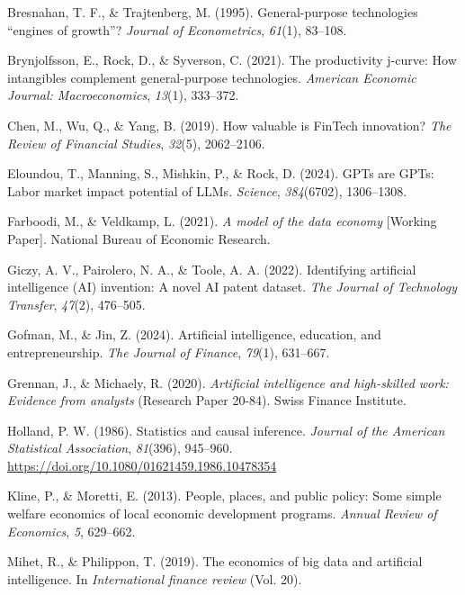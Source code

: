 \documentclass[
]{article}
\newlength{\cslhangindent}
\newenvironment{CSLReferences}[2] %
 {\begin{list}{}{%
  \setlength{\itemindent}{0pt}
  \setlength{\leftmargin}{0pt}
  \setlength{\parsep}{0pt}
  \ifodd #1
   \setlength{\leftmargin}{\cslhangindent}
   \setlength{\itemindent}{-1\cslhangindent}
  \fi
  \setlength{\itemsep}{#2\baselineskip}}}
 {\end{list}}
\begin{document}
\begin{CSLReferences}{1}{0}
Bresnahan, T. F., \& Trajtenberg, M. (1995). General-purpose
technologies {``engines of growth''}? \emph{Journal of Econometrics},
\emph{61}(1), 83--108.

Brynjolfsson, E., Rock, D., \& Syverson, C. (2021). The productivity
j-curve: How intangibles complement general-purpose technologies.
\emph{American Economic Journal: Macroeconomics}, \emph{13}(1),
333--372.

Chen, M., Wu, Q., \& Yang, B. (2019). How valuable is FinTech
innovation? \emph{The Review of Financial Studies}, \emph{32}(5),
2062--2106.

Eloundou, T., Manning, S., Mishkin, P., \& Rock, D. (2024). GPTs are
GPTs: Labor market impact potential of LLMs. \emph{Science},
\emph{384}(6702), 1306--1308.

Farboodi, M., \& Veldkamp, L. (2021). \emph{A model of the data economy}
{[}Working Paper{]}. National Bureau of Economic Research.

Giczy, A. V., Pairolero, N. A., \& Toole, A. A. (2022). Identifying
artificial intelligence (AI) invention: A novel AI patent dataset.
\emph{The Journal of Technology Transfer}, \emph{47}(2), 476--505.

Gofman, M., \& Jin, Z. (2024). Artificial intelligence, education, and
entrepreneurship. \emph{The Journal of Finance}, \emph{79}(1), 631--667.

Grennan, J., \& Michaely, R. (2020). \emph{Artificial intelligence and
high-skilled work: Evidence from analysts} (Research Paper 20-84). Swiss
Finance Institute.

Holland, P. W. (1986). Statistics and causal inference. \emph{Journal of
the American Statistical Association}, \emph{81}(396), 945--960.
\url{https://doi.org/10.1080/01621459.1986.10478354}

Kline, P., \& Moretti, E. (2013). People, places, and public policy:
Some simple welfare economics of local economic development programs.
\emph{Annual Review of Economics}, \emph{5}, 629--662.

Mihet, R., \& Philippon, T. (2019). The economics of big data and
artificial intelligence. In \emph{International finance review} (Vol.
20).


\end{CSLReferences}
\end{document}
